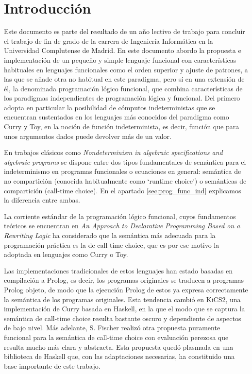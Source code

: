 \documentclass[class=article, crop=false]{standalone}
\begin{document}
\section{Introducción}
Este documento es parte del resultado de un año lectivo de trabajo para concluir el trabajo
de fin de grado de la carrera de Ingeniería Informática en la Universidad Complutense de
Madrid. En este documento abordo la propuesta e implementación de un pequeño y simple
lenguaje funcional con características habituales en lenguajes funcionales como el orden
superior y ajuste de patrones, a las que se añade otra no habitual en este paradigma, pero sí
en una extensión de él, la denominada programación lógico
funcional\cite{antoy2010functional}, que combina características de los paradigmas
independientes de programación lógica y funcional. Del primero adopta en particular la
posibilidad de cómputos indeterministas que se encuentran sustentados en los lenguajes más
conocidos del paradigma como Curry\cite{Hanus16Curry} y Toy\cite{fraguas1999toy}, en la
noción de función indeterminista, es decir, función que para unos argumentos dados puede
devolver más de un valor.

En trabajos clásicos como \textit{Nondeterminism in algebraic specifications and algebraic
programs}\cite{hussmann1993nondeterminism} se dispone entre dos tipos fundamentales de
semántica para el indeterminismo en programas funcionales o ecuaciones en general:
semántica de no compartición (conocida habitualmente como `runtime choice') o semánticas de
compartición (call-time choice). En el apartado \ref{sec:prog_func_ind} explicamos la
diferencia entre ambas.

La corriente estándar de la programación lógico funcional, cuyos fundamentos teóricos se
encuentran en \textit{An Approach to Declarative Programming Based on a Rewriting Logic
}\cite{DBLP:journals/jlp/Gonzalez-MorenoHLR99} ha considerado que la semántica más adecuada
para la programación práctica es la de call-time choice, que es por ese motivo la adoptada en
lenguajes como Curry o Toy.

Las implementaciones tradicionales de estos lenguajes han estado basadas en compilación a
Prolog\cite{deransart2012prolog}, es decir, los programas originales se traducen a programas
Prolog objeto, de modo que la ejecución Prolog de estos ya expresa correctamente la semántica
de los programas originales. Esta tendencia cambió en
KiCS2\cite{BrasselHanusPeemoellerReck11}, una implementación de Curry basada en Haskell, en
la que el modo que se captura la semántica de call-time choice resulta bastante oscuro y
dependiente de aspectos de bajo nivel. Más adelante, S. Fischer realizó otra propuesta
puramente funcional para la semántica de call-time choice con evaluación
perezosa\cite{fischer2011purely} que resulta mucho más clara y abstracta. Esta propuesta
quedó plasmada en una biblioteca de Haskell que, con las adaptaciones necesarias, ha
constituido una base importante de este trabajo.
\end{document}
